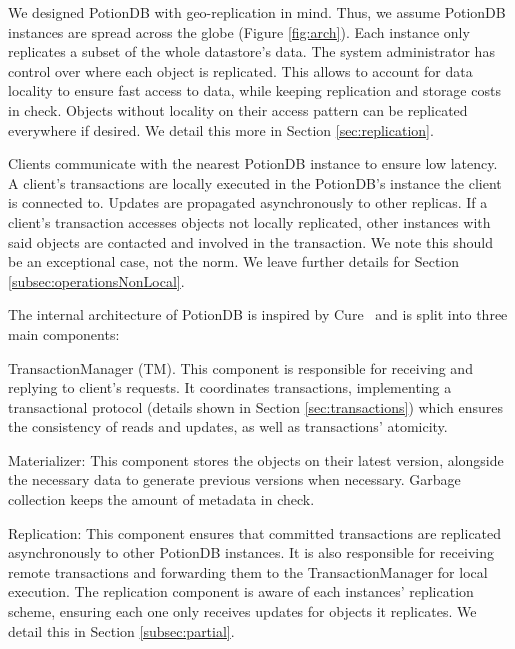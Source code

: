 \documentclass{vldb}
\begin{document}
We designed PotionDB with geo-replication in mind.
Thus, we assume PotionDB instances are spread across the globe (Figure \ref{fig:arch}).
Each instance only replicates a subset of the whole datastore's data.
The system administrator has control over where each object is replicated.
This allows to account for data locality to ensure fast access to data, while keeping replication and storage costs in check.
Objects without locality on their access pattern can be replicated everywhere if desired.
We detail this more in Section \ref{sec:replication}.

Clients communicate with the nearest PotionDB instance to ensure low latency.
A client's transactions are locally executed in the PotionDB's instance the client is connected to.
Updates are propagated asynchronously to other replicas.
If a client's transaction accesses objects not locally replicated, other instances with said objects are contacted and involved in the transaction.
We note this should be an exceptional case, not the norm.
We leave further details for Section \ref{subsec:operationsNonLocal}.

The internal architecture of PotionDB is inspired by Cure~\cite{cure} and is split into three main components:

\begin{compactitem}
	\item TransactionManager (TM). This component is responsible for receiving and replying to client's requests.
	It coordinates transactions, implementing a transactional protocol (details shown in Section \ref{sec:transactions}) which ensures the consistency of reads and updates, as well as transactions' atomicity.
	\item Materializer: This component stores the objects on their latest version, alongside the necessary data to generate previous versions when necessary.
	Garbage collection keeps the amount of metadata in check.
	\item Replication: This component ensures that committed transactions are replicated asynchronously to other PotionDB instances.
	It is also responsible for receiving remote transactions and forwarding them to the TransactionManager for local execution.
	The replication component is aware of each instances' replication scheme, ensuring each one only receives updates for objects it replicates. We detail this in Section \ref{subsec:partial}.
\end{compactitem}
\end{document}
